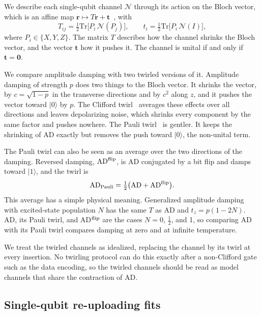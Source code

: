 \documentclass[
 aps,pra,
 twocolumn,
 superscriptaddress,
 longbibliography,
 nofootinbib
]{revtex4-2}
\newcommand{\Tr}{\mathrm{Tr}}
\providecommand{\ket}[1]{\lvert #1 \rangle}
\newcommand{\AD}{\mathrm{AD}}
\begin{document}
We describe each single-qubit channel $\mathcal N$ through its action on the
Bloch vector, which is an affine map $\mathbf r\mapsto T\mathbf r+\mathbf t$~\cite{nielsen2010quantum}, with
\begin{equation}
T_{ij}=\tfrac12\Tr\bigl[P_i\,\mathcal N(P_j)\bigr],\qquad
t_i=\tfrac12\Tr\bigl[P_i\,\mathcal N(I)\bigr],
\label{eq:bloch}
\end{equation}
where $P_i\in\{X,Y,Z\}$. The matrix $T$ describes how the channel shrinks the
Bloch vector, and the vector $\mathbf t$ how it pushes it. The channel is
unital if and only if $\mathbf t=\mathbf 0$.

We compare amplitude damping with two twirled versions of it. Amplitude damping
of strength $p$ does two things to the Bloch vector. It shrinks the vector, by
$c=\sqrt{1-p}$ in the transverse directions and by $c^2$ along $z$, and it
pushes the vector toward $\ket0$ by $p$. The Clifford twirl~\cite{dankert2009exact}
averages these effects over all directions and leaves depolarizing noise, which
shrinks every component by the same factor and pushes nowhere. The Pauli
twirl~\cite{dur2005standard,wallman2016noise} is gentler. It keeps the
shrinking of AD exactly but removes the push toward $\ket0$, the non-unital
term.

The Pauli twirl can also be seen as an average over the two directions of the
damping. Reversed damping, $\AD^{\rm flip}$, is AD conjugated by a bit flip and damps
toward $\ket1$, and the twirl is
\begin{equation}
\AD_{\rm Pauli}=\tfrac12\bigl(\AD+\AD^{\rm flip}\bigr).
\label{eq:twirl_mix}
\end{equation}
This average has a simple physical meaning. Generalized amplitude
damping~\cite{nielsen2010quantum} with excited-state population $N$ has the
same $T$ as AD and $t_z=p(1-2N)$. AD, its Pauli twirl, and AD$^{\rm flip}$ are
the cases $N=0$, $\frac12$, and 1, so comparing AD with its Pauli twirl compares
damping at zero and at infinite temperature.

We treat the twirled channels as idealized, replacing the channel by its twirl
at every insertion. No twirling protocol can do this exactly after a
non-Clifford gate such as the data encoding, so the twirled channels should be
read as model channels that share the contraction of AD.

\subsection{Single-qubit re-uploading fits}
\label{sec:model_vr}
\end{document}

